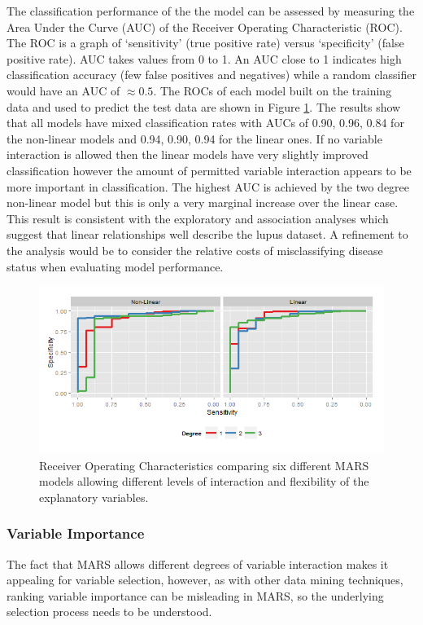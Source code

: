 \documentclass[a4paper, 12pt]{report}
\begin{document}
 The classification  performance of the the model can be assessed by measuring the Area Under the Curve (\gls{AUC}) of the Receiver Operating Characteristic (\gls{ROC}). The ROC is a graph of `sensitivity' (true positive rate) versus `specificity' (false positive rate). AUC takes values from 0 to 1. An AUC close to 1 indicates high classification accuracy (few false positives and negatives) while a random classifier would have an AUC of $\approx 0.5$. The ROCs of each model built on the training data and used to predict the test data are shown in Figure \ref{F:marsROC}. The results show that all models have mixed classification rates with AUCs of 0.90, 0.96, 0.84 for the non-linear models and 0.94, 0.90, 0.94 for the linear ones. If no variable interaction is allowed then the linear models have very slightly improved classification however the amount of permitted variable interaction appears to be more important in classification. The highest AUC is achieved by the two degree non-linear model but this is only a very marginal increase over the linear case. This result is consistent with the exploratory and association analyses which suggest that linear relationships well describe the lupus dataset. A refinement to the analysis would be to consider the relative costs of misclassifying disease status when evaluating model performance.

\begin{figure}[H]
\begin{centering}
\includegraphics[width=\textwidth]{marsROC.png}
\caption{Receiver Operating Characteristics comparing six different MARS models allowing different levels of interaction and flexibility of the explanatory variables.} 
\label{F:marsROC}
\end{centering}
\end{figure}

\subsubsection{Variable Importance}
The fact that MARS allows different degrees of variable interaction makes it appealing for variable selection, however, as with other data mining techniques, ranking variable importance can be misleading in MARS, so the underlying selection process needs to be understood. 
\end{document}

